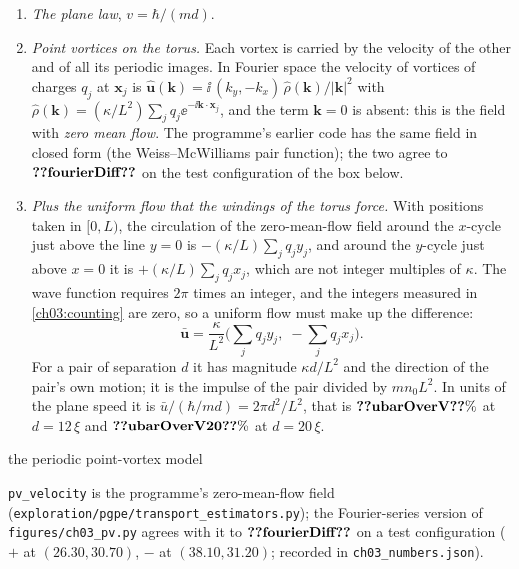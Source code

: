 \begin{enumerate}
\item \emph{The plane law}, $v=\hbar/(md)$.
\item \emph{Point vortices on the torus.} Each vortex is carried by the velocity of the other and of all its periodic images. In Fourier space the velocity of vortices of charges $q_j$ at $\mathbf x_j$ is $\hat{\mathbf u}(\mathbf k)=\ii\,(k_y,-k_x)\,\hat\rho(\mathbf k)/|\mathbf k|^2$ with $\hat\rho(\mathbf k)=(\kappa/L^2)\sum_jq_j\ee^{-\ii\mathbf k\cdot\mathbf x_j}$, and the term $\mathbf k=0$ is absent: this is the field with \emph{zero mean flow}. The programme's earlier code has the same field in closed form (the Weiss--McWilliams pair function); the two agree to $\cthreeNum{fourierDiff}$ on the test configuration of the box below.
\item \emph{Plus the uniform flow that the windings of the torus force.} With positions taken in $[0,L)$, the circulation of the zero-mean-flow field around the $x$-cycle just above the line $y=0$ is $-(\kappa/L)\sum_jq_jy_j$, and around the $y$-cycle just above $x=0$ it is $+(\kappa/L)\sum_jq_jx_j$, which are not integer multiples of $\kappa$. The wave function requires $2\pi$ times an integer, and the integers measured in \cref{ch03:counting} are zero, so a uniform flow must make up the difference:
\begin{equation}\label{ch03:eq-ubar}
  \bar{\mathbf u}=\frac{\kappa}{L^2}\Big(\sum_jq_jy_j,\;-\sum_jq_jx_j\Big).
\end{equation}
For a pair of separation $d$ it has magnitude $\kappa d/L^2$ and the direction of the pair's own motion; it is the impulse of the pair divided by $mn_0L^2$. In units of the plane speed it is $\bar u/(\hbar/md)=2\pi d^2/L^2$, that is $\cthreeNum{ubarOverV}\%$ at $d=12\,\xi$ and $\cthreeNum{ubarOverV20}\%$ at $d=20\,\xi$.
\end{enumerate}

\begin{rustbox}{the periodic point-vortex model}

\medskip

\smallskip\footnotesize
\texttt{pv\_velocity} is the programme's zero-mean-flow field (\texttt{exploration/pgpe/transport\_estimators.py}); the Fourier-series version  of \texttt{figures/ch03\_pv.py} agrees with it to $\cthreeNum{fourierDiff}$ on a test configuration ($+$ at $(26.30,30.70)$, $-$ at $(38.10,31.20)$; recorded in \texttt{ch03\_numbers.json}).
\end{rustbox}

